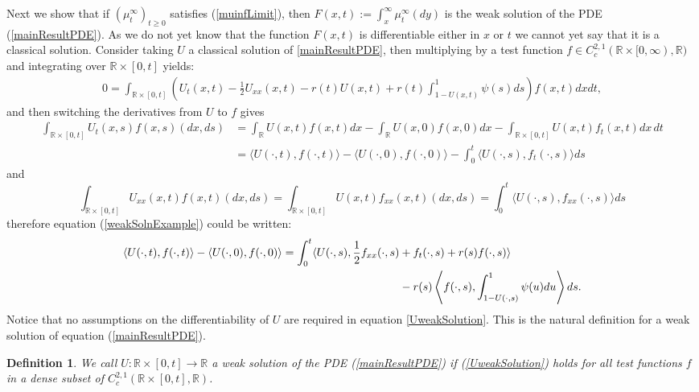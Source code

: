 \documentclass{article}
\newtheorem{defn}{Definition}
\newcommand{\B}[1]{\mathbb{#1}}
\begin{document}
Next we show that if $(\mu^\infty_t)_{t\geq 0}$ satisfies (\ref{muinfLimit}), then $F(x,t):=\int_x^\infty \mu^\infty_t(dy)$ is the weak solution of the PDE (\ref{mainResultPDE}). As we do not yet know that the function $F(x,t)$ is differentiable either in $x$ or $t$ we cannot yet say that it is a classical solution. Consider taking
$U$ a classical solution of \eqref{mainResultPDE}, 
then multiplying by a test function $f\in C_c^{2,1}(\B{R}\times [0,\infty),\B{R})$ and integrating over $\B{R}\times [0,t]$  yields:
\begin{align}\label{weakSolnExample} 0 = \int_{\B{R}\times [0,t]} \left(U_t(x,t) -\frac12 U_{xx}(x,t) - r(t)U(x,t)+r(t)\int_{1-U(x,t)}^1 \psi(s)ds\right)f(x,t)dxdt,\end{align}
and then switching the derivatives from $U$ to $f$ gives 
\begin{align*}\int_{\B{R}\times [0,t]}U_t(x,s)f(x,s)(dx,ds)&= \int_{\B{R}}U(x,t)f(x,t)dx -\int_{\B{R}}U(x,0)f(x,0)dx - \int_{\B{R}\times [0,t]}U(x,t)f_t(x,t)dx\,dt\\
&=\langle U(\cdot,t),f(\cdot,t)\rangle - \langle U(\cdot,0),f(\cdot,0)\rangle - \int_0^t \langle U(\cdot,s),f_t(\cdot,s)\rangle ds\end{align*}
and 
$$\int_{\B{R}\times [0,t]}U_{xx}(x,t)f(x,t)(dx,ds)=\int_{\B{R}\times [0,t]} U(x,t)f_{xx}(x,t)(dx,ds)=\int_0^t \langle U(\cdot,s),f_{xx}(\cdot,s)\rangle ds$$
therefore equation (\ref{weakSolnExample}) could be written:
\begin{align} \label{UweakSolution}
        \langle U(\cdot,t),f(\cdot,t)\rangle - \langle U(\cdot,0), f(\cdot,0)\rangle = \int_0^t \langle U(\cdot,s),\frac12 f_{xx}(\cdot,s) &+ f_t(\cdot,s) + r(s)f(\cdot,s)\rangle \\
        &- r(s)\left\langle f(\cdot,s),\int_{1-U(\cdot,s)}^1 \psi(u)du\right\rangle ds. \notag
\end{align} 
Notice that no assumptions on the differentiability of $U$ are required in equation \eqref{UweakSolution}. This is the natural definition for a weak solution of equation (\ref{mainResultPDE}). 

\vspace{1em}

\begin{defn}
    We call $U:\B{R}\times [0,t]\to \B{R}$ a weak solution of the PDE (\ref{mainResultPDE}) if (\ref{UweakSolution}) holds for all test functions $f$ in a dense subset of $C_c^{2,1}(\B{R}\times [0,t],\B{R})$.
\end{defn}
\end{document}
